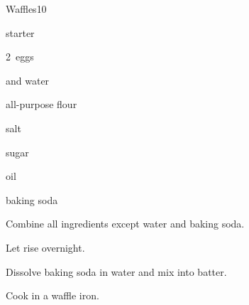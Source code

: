 \begin{recipe}{Waffles}{}{10}

\begin{ingredients}
\item {} starter
\item 2~eggs
\item {} and  water
\item {} all-purpose flour
\item {} salt
\item {} sugar
\item {} oil
\item {} baking soda
\end{ingredients}

\begin{directions}
\item Combine all ingredients except  water and baking soda.
\item Let rise overnight.
\item Dissolve baking soda in water and mix into batter.
\item Cook in a waffle iron.
\end{directions}

\end{recipe}
